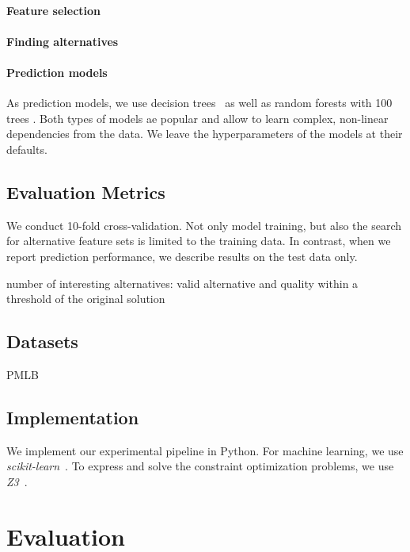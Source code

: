 \documentclass{article}
\theoremstyle{definition}
\begin{document}
\paragraph{Feature selection}

\paragraph{Finding alternatives}

\paragraph{Prediction models}

As prediction models, we use decision trees~\cite{breiman1984classification} as well as random forests with 100 trees \cite{breiman2001random}.
Both types of models ae popular and allow to learn complex, non-linear dependencies from the data.
We leave the hyperparameters of the models at their defaults.

\subsection{Evaluation Metrics}

We conduct 10-fold cross-validation.
Not only model training, but also the search for alternative feature sets is limited to the training data.
In contrast, when we report prediction performance, we describe results on the test data only.

number of interesting alternatives: valid alternative and quality within a threshold of the original solution

\subsection{Datasets}

PMLB \cite{olson2017pmlb, romano2021pmlb}

\subsection{Implementation}

We implement our experimental pipeline in Python.
For machine learning, we use \emph{scikit-learn}~\cite{pedregosa2011scikit-learn}.
To express and solve the constraint optimization problems, we use \emph{Z3}~\cite{deMoura2008z3}.

\section{Evaluation}
\label{sec:evaluation}
\end{document}
